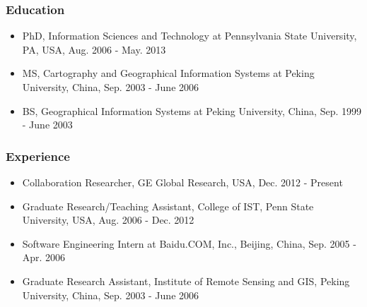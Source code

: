 \subsubsection*{Education} %
\label{ssub:education}
\begin{itemize}
	\item PhD, Information Sciences and Technology at Pennsylvania State University, PA, USA, Aug. 2006 - May. 2013
	\item MS, Cartography and Geographical Information Systems at Peking University, China, Sep. 2003 - June 2006
	\item BS, Geographical Information Systems at Peking University, China, Sep. 1999 - June 2003
\end{itemize}

\subsubsection*{Experience} %
\label{ssub:experience}
\begin{itemize}
	\item Collaboration Researcher, GE Global Research, USA, Dec. 2012 - Present
	\item Graduate Research/Teaching Assistant, College of IST, Penn State University, USA, Aug. 2006 - Dec. 2012
	\item Software Engineering Intern at Baidu.COM, Inc., Beijing, China, Sep. 2005 - Apr. 2006
	\item Graduate Research Assistant, Institute of Remote Sensing and GIS, Peking University, China, Sep. 2003 - June 2006  
\end{itemize}

